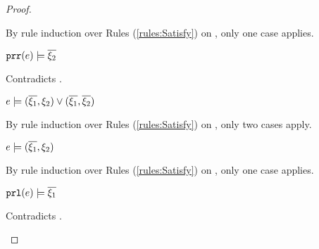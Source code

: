 \begin{proof}
\begin{byCases}
\begin{byCases}
\begin{byCases}
\begin{byCases}
                By rule induction over Rules (\ref{rules:Satisfy}) on , only one case applies.
                \begin{byCases}
                \item[\text{(\ref{rule:CSNotValPair})}]
                    \begin{pfsteps*}
                    \item $\mathtt{prr}(e) \models \overline{\xi_2}$ 
                    \end{pfsteps*}
                    Contradicts .
                \end{byCases}
            \item[\text{(\ref{rule:CSOr2})}]
                \begin{pfsteps*}
                \item $e \models (\overline{\xi_1} , \xi_2) \vee (\overline{\xi_1} , \overline{\xi_2})$  
                \end{pfsteps*}
                By rule induction over Rules (\ref{rules:Satisfy}) on , only two cases apply.
                \begin{byCases}
                \item[\text{(\ref{rule:CSOr1})}]
                    \begin{pfsteps*}
                    \item $e \models (\overline{\xi_1} , \xi_2)$  
                    \end{pfsteps*}
                    By rule induction over Rules (\ref{rules:Satisfy}) on , only one case applies.
                    \begin{byCases}
                    \item[\text{(\ref{rule:CSNotValPair})}]
                        \begin{pfsteps*}
                        \item $\mathtt{prl}(e) \models \overline{\xi_1}$ 
                        \end{pfsteps*}
                        Contradicts .
                    \end{byCases}
                \item[\text{(\ref{rule:CSOr2})}]

\end{byCases}
\end{byCases}
\end{byCases}
\end{byCases}
\end{byCases}
\end{proof}
